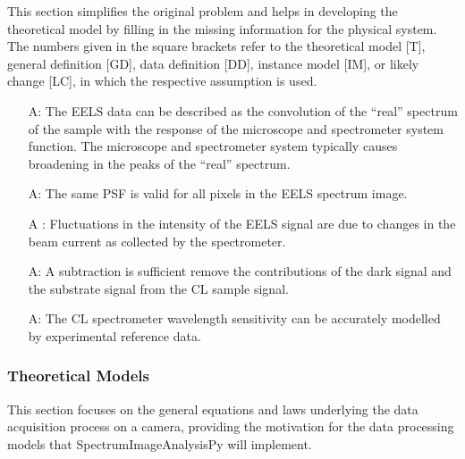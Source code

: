 \documentclass[12pt]{article}
\newcounter{assumpnum} %
\newcommand{\progname}{SpectrumImageAnalysisPy} %
\begin{document}
This section simplifies the original problem and helps in developing the
theoretical model by filling in the missing information for the physical
system. The numbers given in the square brackets refer to the theoretical model
[T], general definition [GD], data definition [DD], instance model [IM], or
likely change [LC], in which the respective assumption is used.

\begin{itemize}

	\item[A\refstepcounter{assumpnum}\theassumpnum \label{EELS_System_Response}:]
The EELS data can be described as the convolution of the ``real'' spectrum of
the sample with the response of the microscope and spectrometer system function.
The microscope and spectrometer system typically causes broadening in the peaks
of the ``real'' spectrum.
	
	\item[A\refstepcounter{assumpnum}\theassumpnum \label{EELS_PSF_variability}:]
The same PSF is valid for all pixels in the EELS spectrum image.
	
	\item[A\refstepcounter{assumpnum}\theassumpnum
\label{EELS_Intensity_Fluctuations}:] Fluctuations in the intensity of the EELS
signal are due to changes in the beam current as collected by the spectrometer.
	
	\item[A\refstepcounter{assumpnum}\theassumpnum \label{CL_Background}:] A
subtraction is sufficient  remove the contributions of the dark signal and the
substrate signal from the CL sample signal.
	
	\item[A\refstepcounter{assumpnum}\theassumpnum \label{CL_System_Response}:] The
CL spectrometer wavelength sensitivity can be accurately modelled by
experimental reference data.

\end{itemize}

\subsubsection{Theoretical Models}\label{sssec:TM}

This section focuses on the general equations and laws underlying the data
acquisition process on a camera, providing the motivation for the data
processing models that \progname{} will implement.

~\newline
\end{document}
